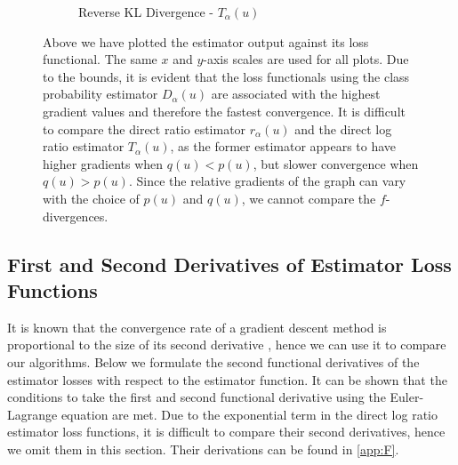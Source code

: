 \documentclass[honours,12pt, twoside]{unswthesis}
\numberwithin{equation}{section}
\theoremstyle{definition}
\begin{document}
\begin{figure}[h!]
\begin{subfigure}{0.49\textwidth}
\caption{Reverse KL Divergence - $T_\alpha(u)$}
\end{subfigure}
\caption{\small Above we have plotted the estimator output against its loss functional. The same $x$ and $y$-axis scales are used for all plots. Due to the bounds, it is evident that the loss functionals using the class probability estimator $D_\alpha(u)$ are associated with the highest gradient values and therefore the fastest convergence. It is difficult to compare the direct ratio estimator $r_\alpha(u)$ and the direct log ratio estimator $T_\alpha(u)$, as the former estimator appears to have higher gradients when $q(u)<p(u)$, but slower convergence when $q(u)>p(u)$. Since the relative gradients of the graph can vary with the choice of $p(u)$ and $q(u)$, we cannot compare the $f$-divergences.}
\label{fig:7.1}
\end{figure}
\subsection{First and Second Derivatives of Estimator Loss Functions}
It is known that the convergence rate of a gradient descent method is proportional to the size of its second derivative \citep{lecun}, hence we can use it to compare our algorithms. Below we formulate the second functional derivatives of the estimator losses with respect to the estimator function. It can be shown that the conditions to take the first and second functional derivative using the Euler-Lagrange equation are met. Due to the exponential term in the direct log ratio estimator loss functions, it is difficult to compare their second derivatives, hence we omit them in this section. Their derivations can be found in \autoref{app:F}. 
\end{document}

